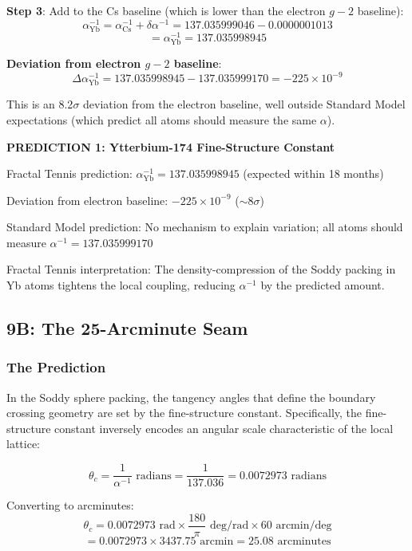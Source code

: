 \documentclass[11pt,a4paper]{article}
\begin{document}
\noindent\textbf{Step 3}: Add to the Cs baseline (which is lower than the electron $g-2$ baseline):
\[
\alpha^{-1}_\mathrm{Yb} = \alpha^{-1}_\mathrm{Cs} + \delta\alpha^{-1} = 137.035999046 - 0.0000001013
\]
\[
= \boxed{\alpha^{-1}_\mathrm{Yb} = 137.035998945}
\]

\noindent\textbf{Deviation from electron $g-2$ baseline}:
\[
\Delta\alpha^{-1}_{\mathrm{Yb}} = 137.035998945 - 137.035999170 = -225 \times 10^{-9}
\]

This is an 8.2$\sigma$ deviation from the electron baseline, well outside Standard Model expectations (which predict all atoms should measure the same $\alpha$).

\begin{mdframed}
\centering
\textbf{PREDICTION 1: Ytterbium-174 Fine-Structure Constant}

\vspace{0.5em}

Fractal Tennis prediction: $\alpha^{-1}_{\mathrm{Yb}} = 137.035998945$ (expected within 18 months)

Deviation from electron baseline: $-225 \times 10^{-9}$ ($\sim 8\sigma$)

Standard Model prediction: No mechanism to explain variation; all atoms should measure $\alpha^{-1} = 137.035999170$

Fractal Tennis interpretation: The density-compression of the Soddy packing in Yb atoms tightens the local coupling, reducing $\alpha^{-1}$ by the predicted amount.
\end{mdframed}

\subsection{9B: The 25-Arcminute Seam}

\subsubsection{The Prediction}

In the Soddy sphere packing, the tangency angles that define the boundary crossing geometry are set by the fine-structure constant. Specifically, the fine-structure constant inversely encodes an angular scale characteristic of the local lattice:

\[
\theta_c = \frac{1}{\alpha^{-1}} \text{ radians} = \frac{1}{137.036} = 0.0072973 \text{ radians}
\]

\noindent Converting to arcminutes:
\[
\theta_c = 0.0072973 \text{ rad} \times \frac{180}{\pi} \text{ deg/rad} \times 60 \text{ arcmin/deg}
\]
\[
= 0.0072973 \times 3437.75 \text{ arcmin} = 25.08 \text{ arcminutes}
\]
\end{document}
